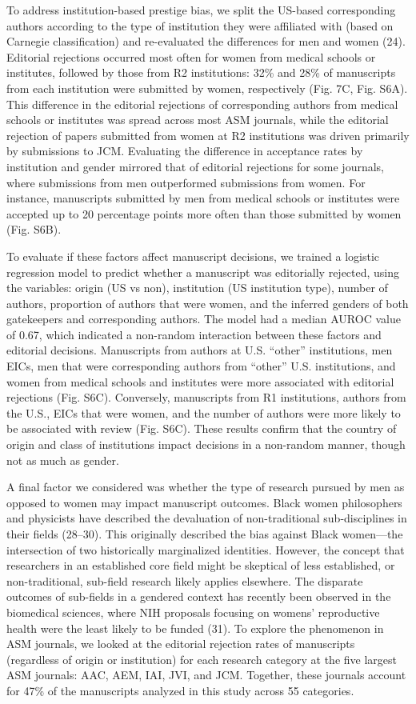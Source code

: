 \documentclass[11pt,]{article}
\begin{document}
To address institution-based prestige bias, we split the US-based
corresponding authors according to the type of institution they were
affiliated with (based on Carnegie classification) and re-evaluated the
differences for men and women (24). Editorial rejections occurred most
often for women from medical schools or institutes, followed by those
from R2 institutions: 32\% and 28\% of manuscripts from each institution
were submitted by women, respectively (Fig. 7C, Fig. S6A). This
difference in the editorial rejections of corresponding authors from
medical schools or institutes was spread across most ASM journals, while
the editorial rejection of papers submitted from women at R2
institutions was driven primarily by submissions to JCM. Evaluating the
difference in acceptance rates by institution and gender mirrored that
of editorial rejections for some journals, where submissions from men
outperformed submissions from women. For instance, manuscripts submitted
by men from medical schools or institutes were accepted up to 20
percentage points more often than those submitted by women (Fig. S6B).

To evaluate if these factors affect manuscript decisions, we trained a
logistic regression model to predict whether a manuscript was
editorially rejected, using the variables: origin (US vs non),
institution (US institution type), number of authors, proportion of
authors that were women, and the inferred genders of both gatekeepers
and corresponding authors. The model had a median AUROC value of 0.67,
which indicated a non-random interaction between these factors and
editorial decisions. Manuscripts from authors at U.S. ``other''
institutions, men EICs, men that were corresponding authors from
``other'' U.S. institutions, and women from medical schools and
institutes were more associated with editorial rejections (Fig. S6C).
Conversely, manuscripts from R1 institutions, authors from the U.S.,
EICs that were women, and the number of authors were more likely to be
associated with review (Fig. S6C). These results confirm that the
country of origin and class of institutions impact decisions in a
non-random manner, though not as much as gender.

A final factor we considered was whether the type of research pursued by
men as opposed to women may impact manuscript outcomes. Black women
philosophers and physicists have described the devaluation of
non-traditional sub-disciplines in their fields (28--30). This
originally described the bias against Black women---the intersection of
two historically marginalized identities. However, the concept that
researchers in an established core field might be skeptical of less
established, or non-traditional, sub-field research likely applies
elsewhere. The disparate outcomes of sub-fields in a gendered context
has recently been observed in the biomedical sciences, where NIH
proposals focusing on womens' reproductive health were the least likely
to be funded (31). To explore the phenomenon in ASM journals, we looked
at the editorial rejection rates of manuscripts (regardless of origin or
institution) for each research category at the five largest ASM
journals: AAC, AEM, IAI, JVI, and JCM. Together, these journals account
for 47\% of the manuscripts analyzed in this study across 55 categories.
\end{document}
